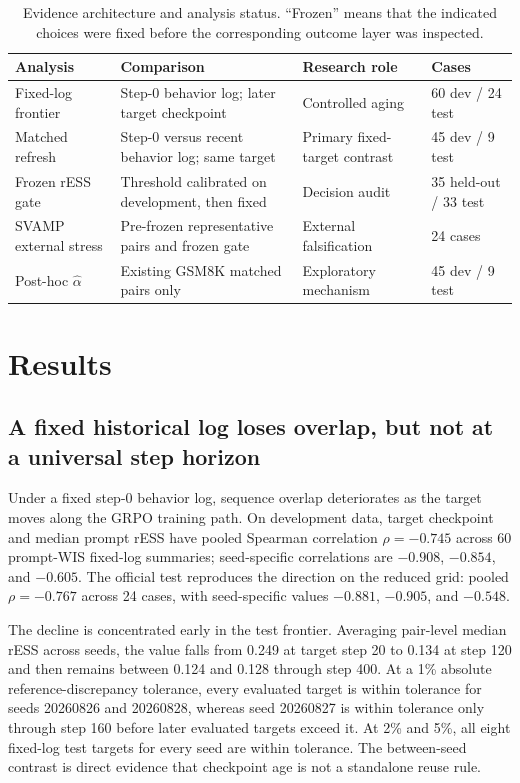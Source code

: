 \documentclass[10pt]{article}
\theoremstyle{remark}
\begin{document}
\begin{table}[H]
\centering
\caption{Evidence architecture and analysis status. ``Frozen'' means that the indicated choices were fixed before the corresponding outcome layer was inspected.}
\label{tab:design}
\small
\begin{tabularx}{\linewidth}{@{}p{2.3cm}Y p{2.7cm}p{2.0cm}@{}}
\toprule
Analysis & Comparison & Research role & Cases \\
\midrule
Fixed-log frontier & Step-0 behavior log; later target checkpoint & Controlled aging & 60 dev / 24 test \\
Matched refresh & Step-0 versus recent behavior log; same target & Primary fixed-target contrast & 45 dev / 9 test \\
Frozen rESS gate & Threshold calibrated on development, then fixed & Decision audit & 35 held-out / 33 test \\
SVAMP external stress & Pre-frozen representative pairs and frozen gate & External falsification & 24 cases \\
Post-hoc $\widehat\alpha$ & Existing GSM8K matched pairs only & Exploratory mechanism & 45 dev / 9 test \\
\bottomrule
\end{tabularx}
\end{table}

\section{Results}
\subsection{A fixed historical log loses overlap, but not at a universal step horizon}
Under a fixed step-0 behavior log, sequence overlap deteriorates as the target moves along the GRPO training path. On development data, target checkpoint and median prompt rESS have pooled Spearman correlation $\rho=-0.745$ across 60 prompt-WIS fixed-log summaries; seed-specific correlations are $-0.908$, $-0.854$, and $-0.605$. The official test reproduces the direction on the reduced grid: pooled $\rho=-0.767$ across 24 cases, with seed-specific values $-0.881$, $-0.905$, and $-0.548$.

The decline is concentrated early in the test frontier. Averaging pair-level median rESS across seeds, the value falls from 0.249 at target step 20 to 0.134 at step 120 and then remains between 0.124 and 0.128 through step 400. At a 1\% absolute reference-discrepancy tolerance, every evaluated target is within tolerance for seeds 20260826 and 20260828, whereas seed 20260827 is within tolerance only through step 160 before later evaluated targets exceed it. At 2\% and 5\%, all eight fixed-log test targets for every seed are within tolerance. The between-seed contrast is direct evidence that checkpoint age is not a standalone reuse rule.
\end{document}

